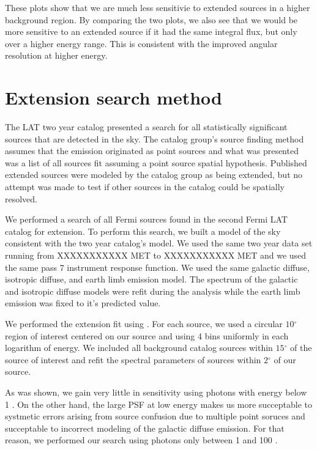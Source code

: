 \documentclass[preprint]{aastex}
\newcommand{\gev}{\text{GeV}\xspace}
\renewcommand{\deg}{\ensuremath{^\circ}\xspace}
\newcommand{\pointlike}{\text{\em pointlike}\xspace}
\begin{document}
These plots show that we are much less sensitivie to extended sources in
a higher background region. By comparing the two plots, we also see that
we would be more sensitive to an extended source if it had the same
integral flux, but only over a higher energy range. This is 
consistent with the improved angular resolution at higher energy.

\section{Extension search method}

The LAT two year catalog presented a search for all
statistically significant sources that are detected in the \gev
sky\cite{second_cat}.  The catalog group's source finding method assumes
that the emission originated as point sources and what was presented was
a list of all sources fit assuming a point source spatial hypothesis. 
Published extended sources were modeled by the catalog group as 
being extended, but no attempt was made to test if other sources in the catalog
could be spatially resolved.

We performed a search of all Fermi sources found in the second Fermi LAT
catalog for extension.  To perform this search, we built a model of the
sky consistent with the two year catalog's model.   We used the same two
year data set running from XXXXXXXXXXX MET to XXXXXXXXXXX MET and we used
the same pass 7 instrument response function.  We used the same galactic
diffuse, isotropic diffuse, and earth limb emission model. The spectrum of
the galactic and isotropic diffuse models were refit during the analysis
while the earth limb emission was fixed to it's predicted value.

We performed the extension fit using \pointlike.  For each source, we
used a circular $10\deg$ region of interest centered on our source and
using 4 bins uniformly in each logarithm of energy.  We included all
background catalog sources within $15\deg$ of the source of interest
and refit the spectral parameters of sources within $2\deg$ of our source.

As was shown, we gain very little in sensitivity using photons with energy
below 1 \gev. On the other hand, the large PSF at low energy makes us
more succeptable to systmetic errors arising from source confusion due
to multiple point soruces and succeptable to incorrect modeling of the
galactic diffuse emission.  For that reason, we performed our search
using photons only between 1 \gev and 100 \gev.
\end{document}
